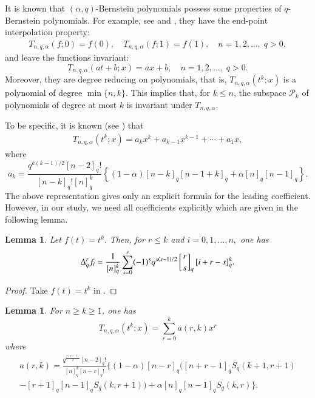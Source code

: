 \documentclass[12pt]{article}
\numberwithin{equation}{section} \theoremstyle{plain}
\newtheorem{lemma}[theorem]{Lemma}
\theoremstyle{definition}
\theoremstyle{remark}
\newcommand{\qbinom}[2]{\left[\genfrac{}{}{0pt}{}{#1}{#2}\right]_{q}}
\begin{document}
It is known that $(\alpha,q)$-Bernstein polynomials possess some properties of $q$-Bernstein polynomials.
For example, see \cite{xia} and \cite{qingbo}, they have the end-point interpolation property:
\begin{align*}
T_{n,q,\alpha}(f;0)=f(0), \quad T_{n,q,\alpha}(f;1)=f(1),\quad n=1, 2, \dots, \;q>0,
\end{align*}
and leave the functions invariant:
\begin{equation*}
T_{n,q,\alpha}(at+b;x)=ax+b,\quad n=1,2,\dots, \;q>0.
\end{equation*}
Moreover, they are degree reducing on polynomials, that is, $T_{n,q,\alpha}(t^k;x)$ is a polynomial of degree $\min\{n,k\}.$ This implies that, for $k\leq n$, the subspace ${\mathcal P}_k$ of polynomials of degree at most $k$ is invariant under $T_{n,q,\alpha}.$

To be specific, it is known (see \cite{qingbo}) that 
\begin{eqnarray*}
T_{n,q,\alpha}(t^k;x)=a_{k}x^k+a_{k-1}x^{k-1}+\cdots+a_{1}x,
\end{eqnarray*}
where 
$$
a_{k}=\frac{q^{k(k-1)/2} [n-2]_q!}{[n-k]_q![n]_q^k}\left\{(1-\alpha)[n-k]_q[n-1+k]_q+\alpha[n]_q[n-1]_q\right\}.
$$
The above representation gives only an explicit formula for the leading coefficient. However, in our study, we need all 
coefficients explicitly which are given in the following lemma.

\begin{lemma}
Let $f(t)=t^k.$ Then, for $r\leq k$ and $i=0,1,\ldots,n,$ one has 
\begin{align}\label{lemqdif}
\Delta_q^{r}f_i=\frac{1}{[n]_q^k}\sum_{s=0}^r (-1)^s q^{s(s-1)/2} \qbinom{r}{s} [i+r-s]_q^k. 
\end{align}
\end{lemma}

\begin{proof} Take $f(t)=t^k$ in \cite[formula (2.1)]{phil}.
\end{proof}

\begin{lemma}
For $n\geq k \geq 1$, one has 
\begin{equation*}
T_{n,q,\alpha}(t^k;x)=\sum_{r=0}^{k}a(r,k)x^r
\end{equation*}
where 
\begin{multline}
a(r,k)=\frac{q^{\frac{r(r-1)}{2}}[n-2]_q!}{[n]_q^k[n-r]_q!}\bigg\{(1-\alpha)[n-r]_q\bigg([n+r-1]_qS_q(k+1,r+1) \\
-[r+1]_q[n-1]_qS_q(k,r+1)\bigg)+\alpha[n]_q[n-1]_qS_q(k,r)\bigg\}.\label{ark}
\end{multline}
\end{lemma}
\end{document}
